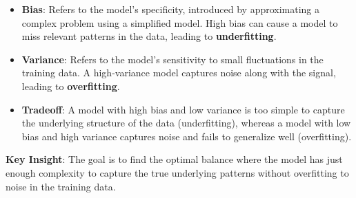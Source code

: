 \begin{itemize}
	\item \textbf{Bias}: Refers to the model's specificity, introduced by approximating a complex problem using a simplified model. High bias can cause a model to miss relevant patterns in the data, leading to \textbf{underfitting}.

	\item \textbf{Variance}: Refers to the model's sensitivity to small fluctuations in the training data. A high-variance model captures noise along with the signal, leading to \textbf{overfitting}.

	\item \textbf{Tradeoff}: A model with high bias and low variance is too simple to capture the underlying structure of the data (underfitting), whereas a model with low bias and high variance captures noise and fails to generalize well (overfitting).
\end{itemize}

\textbf{Key Insight}: The goal is to find the optimal balance where the model has just enough complexity to capture the true underlying patterns without overfitting to noise in the training data.
